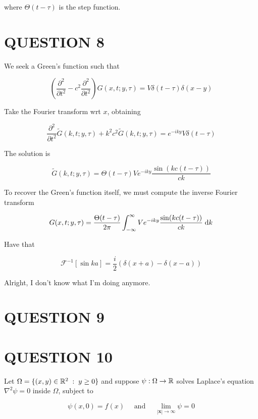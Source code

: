 \documentclass[a4paper]{article}
\begin{document}
where $  \Theta(t - \tau) $ is the step function. 

\section{QUESTION 8}

We seek a Green's function such that

\[ \left(  \frac{\partial^{2} }{\partial t^{2}} - c^{2} \frac{\partial^{2} }{\partial t^{2}} \right)  G(x,t ; y,\tau) = V \delta(t - \tau) \delta(x-y) \]

Take the Fourier transform wrt $ x $, obtaining 

\[ \frac{\partial^{2} }{\partial t^{2}} \tilde{G}(k,t ; y,\tau) + k^{2} c^{2} \tilde{G}(k,t ; y,\tau) = e^{-iky} V  \delta(t - \tau) \]

The solution is

\[ \tilde{G}(k,t ; y,\tau) = \Theta(t-\tau) V e^{-iky}  \frac{\sin(  kc(t-\tau) )  }{ck} \]

To recover the Green's function itself, we must compute the inverse Fourier transform 

\[ G(x,t ; y,\tau) = \frac{\Theta(t-\tau)}{2\pi} \int_{-\infty}^{\infty} V e^{-iky}  \frac{\sin(  kc(t-\tau) )  }{ck} \; \mathrm{d} k \]

Have that 

\[ \mathcal{F}^{-1} [ \sin ka] = \frac{i}{2} ( \delta(x+a) - \delta(x-a))    \]

Alright, I don't know what I'm doing anymore.









\section{QUESTION 9}
\section{QUESTION 10}

Let $ \Omega = \{  (x,y) \in \mathbb{R}^{2} \; : \; y \geq 0 \} $ and suppose $ \psi : \Omega \to \mathbb{R} $ solves Laplace's equation $ \nabla^{2} \psi = 0 $ inside $ \Omega $, subject to

\[ \psi(x,0) = f(x) \quad \text{ and } \quad \lim\limits_{| \mathbf{x} | \to \infty} \psi = 0 \]
\end{document}
